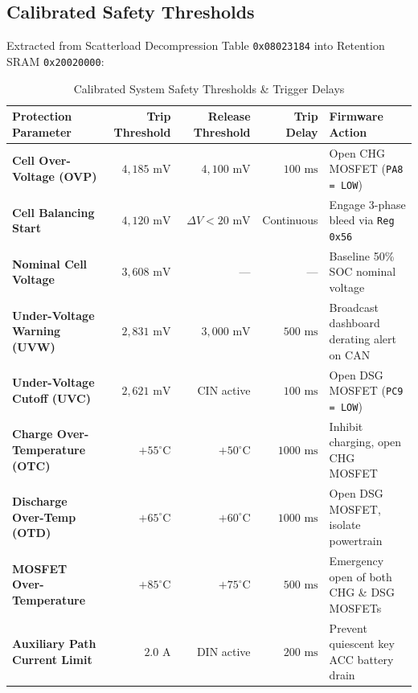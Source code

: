 \documentclass[10pt,a4paper]{article}
\begin{document}
\subsection{Calibrated Safety Thresholds}
Extracted from Scatterload Decompression Table \texttt{0x08023184} into Retention SRAM \texttt{0x20020000}:
\begin{table}[htbp]
\centering
\caption{Calibrated System Safety Thresholds \& Trigger Delays}
\label{tab:safety_thresholds}
\begin{tabularx}{\textwidth}{lrrrl}
\toprule
\textbf{Protection Parameter} & \textbf{Trip Threshold} & \textbf{Release Threshold} & \textbf{Trip Delay} & \textbf{Firmware Action} \\
\midrule
\textbf{Cell Over-Voltage (OVP)} & $4,185\text{ mV}$ & $4,100\text{ mV}$ & $100\text{ ms}$ & Open CHG MOSFET (\texttt{PA8 = LOW}) \\
\textbf{Cell Balancing Start} & $4,120\text{ mV}$ & $\Delta V < 20\text{ mV}$ & Continuous & Engage 3-phase bleed via \texttt{Reg 0x56} \\
\textbf{Nominal Cell Voltage} & $3,608\text{ mV}$ & --- & --- & Baseline 50\% SOC nominal voltage \\
\textbf{Under-Voltage Warning (UVW)} & $2,831\text{ mV}$ & $3,000\text{ mV}$ & $500\text{ ms}$ & Broadcast dashboard derating alert on CAN \\
\textbf{Under-Voltage Cutoff (UVC)} & $2,621\text{ mV}$ & CIN active & $100\text{ ms}$ & Open DSG MOSFET (\texttt{PC9 = LOW}) \\
\textbf{Charge Over-Temperature (OTC)} & $+55^\circ\text{C}$ & $+50^\circ\text{C}$ & $1000\text{ ms}$ & Inhibit charging, open CHG MOSFET \\
\textbf{Discharge Over-Temp (OTD)} & $+65^\circ\text{C}$ & $+60^\circ\text{C}$ & $1000\text{ ms}$ & Open DSG MOSFET, isolate powertrain \\
\textbf{MOSFET Over-Temperature} & $+85^\circ\text{C}$ & $+75^\circ\text{C}$ & $500\text{ ms}$ & Emergency open of both CHG \& DSG MOSFETs \\
\textbf{Auxiliary Path Current Limit} & $2.0\text{ A}$ & DIN active & $200\text{ ms}$ & Prevent quiescent key ACC battery drain \\
\bottomrule
\end{tabularx}
\end{table}
\end{document}
